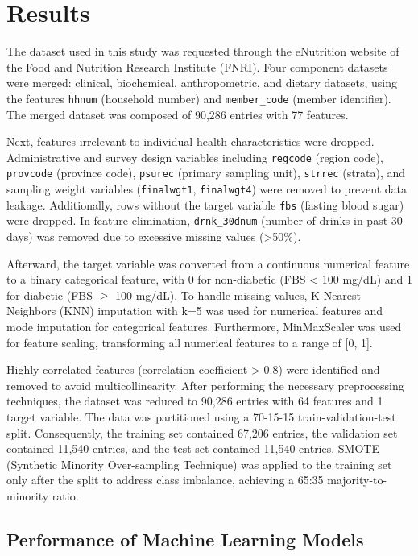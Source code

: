 \section{Results}

The dataset used in this study was requested through the eNutrition website of the Food and Nutrition Research Institute (FNRI). Four component datasets were merged: clinical, biochemical, anthropometric, and dietary datasets, using the features \texttt{hhnum} (household number) and \texttt{member\_code} (member identifier). The merged dataset was composed of 90,286 entries with 77 features. 

Next, features irrelevant to individual health characteristics were dropped. Administrative and survey design variables including \texttt{regcode} (region code), \texttt{provcode} (province code), \texttt{psurec} (primary sampling unit), \texttt{strrec} (strata), and sampling weight variables (\texttt{finalwgt1}, \texttt{finalwgt4}) were removed to prevent data leakage. Additionally, rows without the target variable \texttt{fbs} (fasting blood sugar) were dropped. In feature elimination, \texttt{drnk\_30dnum} (number of drinks in past 30 days) was removed due to excessive missing values (>50\%).

Afterward, the target variable was converted from a continuous numerical feature to a binary categorical feature, with 0 for non-diabetic (FBS < 100 mg/dL) and 1 for diabetic (FBS $\geq$ 100 mg/dL). To handle missing values, K-Nearest Neighbors (KNN) imputation with k=5 was used for numerical features and mode imputation for categorical features. Furthermore, MinMaxScaler was used for feature scaling, transforming all numerical features to a range of [0, 1].

Highly correlated features (correlation coefficient > 0.8) were identified and removed to avoid multicollinearity. After performing the necessary preprocessing techniques, the dataset was reduced to 90,286 entries with 64 features and 1 target variable. The data was partitioned using a 70-15-15 train-validation-test split. Consequently, the training set contained 67,206 entries, the validation set contained 11,540 entries, and the test set contained 11,540 entries. SMOTE (Synthetic Minority Over-sampling Technique) was applied to the training set only after the split to address class imbalance, achieving a 65:35 majority-to-minority ratio.

\subsection{Performance of Machine Learning Models}

